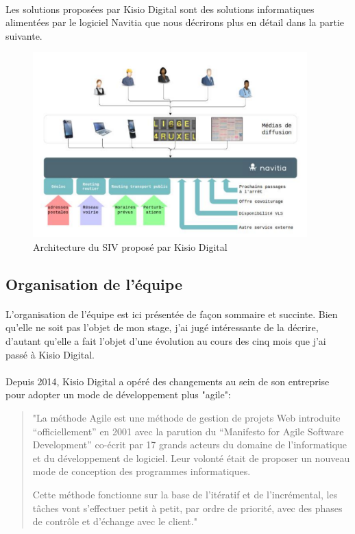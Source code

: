 \documentclass[a4paper]{report}
\begin{document}
\paragraph{} Les solutions proposées par Kisio Digital sont des solutions informatiques alimentées par le logiciel Navitia que nous décrirons plus en détail dans la partie suivante. 

\begin{figure}[H] 
	\begin{center}
		\includegraphics[width=300pt]{image/archi_SIV}
		\caption{Architecture du SIV proposé par Kisio Digital}
		\label{Architecture du SIV proposé par Kisio Digital}
	\end{center}
\end{figure}
\subsection{Organisation de l'équipe}

\paragraph{} L'organisation de l'équipe est ici présentée de façon sommaire et succinte. Bien qu'elle ne soit pas l'objet de mon stage, j'ai jugé intéressante de la décrire, d'autant qu'elle a fait l'objet d'une évolution au cours des cinq mois que j'ai passé à Kisio Digital.

\paragraph {}Depuis 2014, Kisio Digital a opéré des changements au sein de son entreprise pour adopter un mode de développement plus "agile":

\begin{quote}
"La méthode Agile est une méthode de gestion de projets Web introduite “officiellement” en 2001 avec la parution du “Manifesto for Agile Software Development” co-écrit par 17 grands acteurs du domaine de l’informatique et du développement de logiciel. Leur volonté était de proposer un nouveau mode de conception des programmes informatiques.

Cette méthode fonctionne sur la base de l'itératif et de l’incrémental, les tâches vont s’effectuer petit à petit, par ordre de priorité, avec des  phases de contrôle et d’échange avec le client."\cite{ref_agile}
\end{quote}
\end{document}
